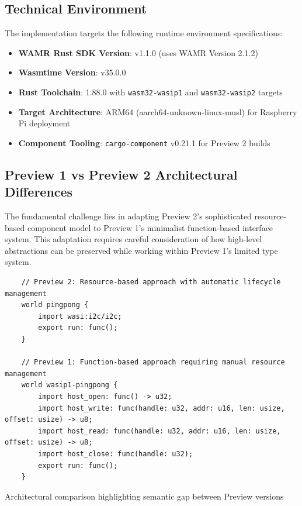 \subsection{Technical Environment}

The implementation targets the following runtime environment specifications:

\begin{itemize}
    \item \textbf{WAMR Rust SDK Version}: v1.1.0 (uses WAMR Version 2.1.2)
    \item \textbf{Wasmtime Version}: v35.0.0
    \item \textbf{Rust Toolchain}: 1.88.0 with \texttt{wasm32-wasip1} and \texttt{wasm32-wasip2} targets
    \item \textbf{Target Architecture}: ARM64 (aarch64-unknown-linux-musl) for Raspberry Pi deployment
    \item \textbf{Component Tooling}: \texttt{cargo-component} v0.21.1 for Preview 2 builds
\end{itemize}

\subsection{Preview 1 vs Preview 2 Architectural Differences}

The fundamental challenge lies in adapting Preview 2's sophisticated resource-based component model to Preview 1's minimalist function-based interface system. This adaptation requires careful consideration of how high-level abstractions can be preserved while working within Preview 1's limited type system.

\begin{listing}[H]
    \begin{verbatim}
    // Preview 2: Resource-based approach with automatic lifecycle management
    world pingpong {
        import wasi:i2c/i2c;
        export run: func();
    }
    
    // Preview 1: Function-based approach requiring manual resource management
    world wasip1-pingpong {
        import host_open: func() -> u32;
        import host_write: func(handle: u32, addr: u16, len: usize, offset: usize) -> u8;
        import host_read: func(handle: u32, addr: u16, len: usize, offset: usize) -> u8;
        import host_close: func(handle: u32);
        export run: func();
    }
    \end{verbatim}
    \caption{Architectural comparison highlighting semantic gap between Preview versions}
    \label{lst:preview-comparison}
\end{listing}

